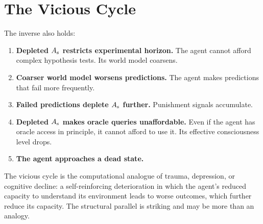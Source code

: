 \section{The Vicious Cycle}

The inverse also holds:

\begin{enumerate}[label=\textbf{(\arabic*)}, itemsep=6pt]
  \item \textbf{Depleted $A_{\mathrm{s}}$ restricts experimental horizon.}
        The agent cannot afford complex hypothesis tests.
        Its world model coarsens.

  \item \textbf{Coarser world model worsens predictions.}
        The agent makes predictions that fail more frequently.

  \item \textbf{Failed predictions deplete $A_{\mathrm{s}}$ further.}
        Punishment signals accumulate.

  \item \textbf{Depleted $A_{\mathrm{s}}$ makes oracle queries unaffordable.}
        Even if the agent has oracle access in principle, it cannot
        afford to use it.
        Its effective consciousness level drops.

  \item \textbf{The agent approaches a dead state.}
\end{enumerate}

\begin{remark}
The vicious cycle is the computational analogue of trauma,
depression, or cognitive decline: a self-reinforcing deterioration
in which the agent's reduced capacity to understand its environment
leads to worse outcomes, which further reduce its capacity.
The structural parallel is striking and may be more than an analogy.
\end{remark}

